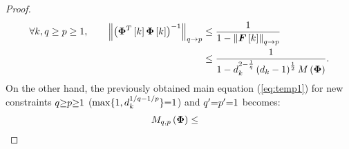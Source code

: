 \begin{proof}
\iffalse
\begin{property}
\label{lm:Horn} 
For $q \sgeq p$, if $\Vert\boldsymbol{A} \Vert_{q \to p} \sless 1$, then \cite{HornR.A.2012}
\begin{gather*}
\myparanthese{\boldsymbol{I} + \boldsymbol{A}}^{-1} = \displaystyle\sum_{i=0}^\infty \myparanthese{-\boldsymbol{A}}^i.
\end{gather*}
\end{property}
\begin{proof}
It follows from Corollary 5.6.16 of \cite{HornR.A.2012}. 
We imposed the constraint $q \sgeq p$, to make the operator-norm a multiplicative norm according to Property \ref{prp:OperatorProperties}.
\end{proof}

Therefore, using the Property \ref{lm:Horn}, and triangle inequality we obtain the following first three lines.
Then, utilising the sum of an infinite geometric series, i.e., $\sum_{i \seq 0}^{\infty} r ^i \seq 1 /(1 - r)$, where $|r| \sless 1$, the following forth line is obtained, because $\Vert\boldsymbol{F}[k] \Vert_{q \to p} \sless 1$.
Finally, the upper bound for $\Vert \boldsymbol{F}[k] \Vert_{q \to p}$, determines the following last upper-bound:
\fi
\begin{equation*}
\label{eq:UB-invPhik2} 
\begin{aligned}
\forall k, q \geq p \geq 1, \qquad
\left\lVert\left( \boldsymbol{\Phi}^T \left[ k \right] \boldsymbol{\Phi} \left[ k \right] \right)^{-1}\right\rVert_{q \to p} &\leq 
\frac{1}{1-\left\lVert\boldsymbol{F}\left[ k \right]\right\rVert_{q \to p}} \\
&\leq \frac{1}{1- d_k^{2 - \frac1q} \left( d_k - 1 \right)^\frac12 M \left( \boldsymbol{\Phi} \right) }.
\end{aligned}
\end{equation*}
On the other hand, the previously obtained main equation (\ref{eq:temp1}) for new constraints $q {\geq} p {\geq} 1$ ($\max \{1 , d_k^{1/q {-} 1/p} \} {=} 1$) and $q' {=} p' {=} 1$ becomes:
\begin{gather}
\begin{aligned}
\label{eq:main-eq2} 
M_{q,p}\myparanthese{\myPhi} &\leq 

\end{aligned}
\end{gather}
\end{proof}
